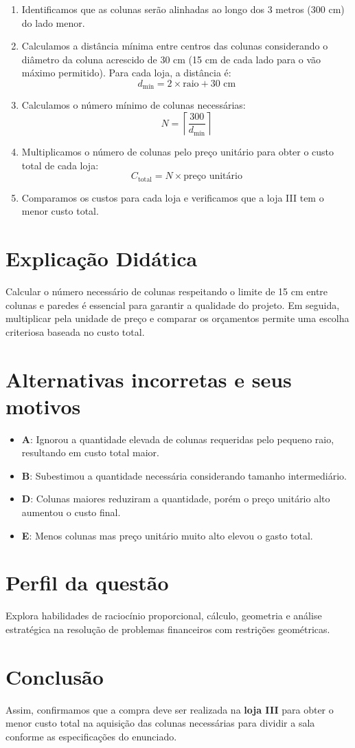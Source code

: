 \documentclass{article}
\begin{document}
\begin{enumerate}
  \item Identificamos que as colunas serão alinhadas ao longo dos 3 metros (300 cm) do lado menor.
  \item Calculamos a distância mínima entre centros das colunas considerando o diâmetro da coluna acrescido de 30 cm (15 cm de cada lado para o vão máximo permitido). Para cada loja, a distância é:
  \[
    d_{\text{mín}} = 2 \times \text{raio} + 30 \text{ cm}
  \]
  \item Calculamos o número mínimo de colunas necessárias:
  \[
    N = \left\lceil \frac{300}{d_{\text{mín}}} \right\rceil
  \]
  \item Multiplicamos o número de colunas pelo preço unitário para obter o custo total de cada loja:
  \[
    C_{\text{total}} = N \times \text{preço unitário}
  \]
  \item Comparamos os custos para cada loja e verificamos que a loja III tem o menor custo total.
\end{enumerate}

\section*{Explicação Didática}
Calcular o número necessário de colunas respeitando o limite de 15 cm entre colunas e paredes é essencial para garantir a qualidade do projeto. Em seguida, multiplicar pela unidade de preço e comparar os orçamentos permite uma escolha criteriosa baseada no custo total.

\section*{Alternativas incorretas e seus motivos}
\begin{itemize}
  \item \textbf{A}: Ignorou a quantidade elevada de colunas requeridas pelo pequeno raio, resultando em custo total maior.
  \item \textbf{B}: Subestimou a quantidade necessária considerando tamanho intermediário.
  \item \textbf{D}: Colunas maiores reduziram a quantidade, porém o preço unitário alto aumentou o custo final.
  \item \textbf{E}: Menos colunas mas preço unitário muito alto elevou o gasto total.
\end{itemize}

\section*{Perfil da questão}
Explora habilidades de raciocínio proporcional, cálculo, geometria e análise estratégica na resolução de problemas financeiros com restrições geométricas.

\section*{Conclusão}
Assim, confirmamos que a compra deve ser realizada na \textbf{loja III} para obter o menor custo total na aquisição das colunas necessárias para dividir a sala conforme as especificações do enunciado.
\end{document}
